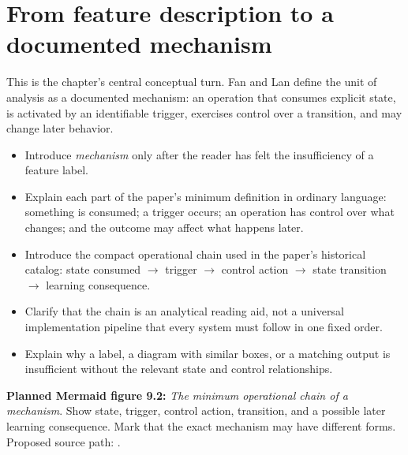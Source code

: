 \section{From feature description to a documented mechanism}
This is the chapter's central conceptual turn. Fan and Lan define the unit of analysis as a documented mechanism: an operation that consumes explicit state, is activated by an identifiable trigger, exercises control over a transition, and may change later behavior.
\begin{itemize}
  \item Introduce \emph{mechanism} only after the reader has felt the insufficiency of a feature label.
  \item Explain each part of the paper's minimum definition in ordinary language: something is consumed; a trigger occurs; an operation has control over what changes; and the outcome may affect what happens later.
  \item Introduce the compact operational chain used in the paper's historical catalog: state consumed $\rightarrow$ trigger $\rightarrow$ control action $\rightarrow$ state transition $\rightarrow$ learning consequence.
  \item Clarify that the chain is an analytical reading aid, not a universal implementation pipeline that every system must follow in one fixed order.
  \item Explain why a label, a diagram with similar boxes, or a matching output is insufficient without the relevant state and control relationships.
\end{itemize}
\textbf{Planned Mermaid figure 9.2:} \emph{The minimum operational chain of a mechanism}. Show state, trigger, control action, transition, and a possible later learning consequence. Mark that the exact mechanism may have different forms. Proposed source path: .

